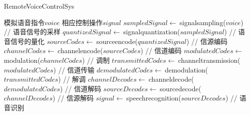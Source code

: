\documentclass[11pt]{article}
\begin{document}
\begin{CJK*}{UTF8}{gkai}
    \begin{algorithm}
        \caption{RemoteVoiceControlSys}
        \begin{algorithmic}[1] %
            \Require 模拟语音指令$voice$
            \Ensure 相应控制操作$signal$
            \State $sampledSignal \gets \ $signalsampling($voice$) // 语音信号的采样
            \State $quantizedSignal \gets\ $signalquantization($sampledSignal$) // 语音信号的量化
            \State $sourceCodes \gets \ $sourceencode($quantizedSignal$) // 信源编码
            \State $channelCodes \gets \ $channelencode($sourceCodes$) // 信道编码
            \State $modulatedCodes \gets \ $modulation($channelCodes$) // 调制
            \State $transmittedCodes \gets \ $channeltransmission($modulatedCodes$) // 信道传输
            \State $demodulatedCodes \gets \ $demodulation($transmittedCodes$) // 解调
            \State $channelDecodes \gets \ $channeldecode($demodulatedCodes$) // 信道解码
            \State $sourceDecodes \gets \ $sourcedecode($channelDecodes$) // 信源解码
            \State $signal \gets \ $speechrecognition($sourceDecodes$) // 语音识别
        \end{algorithmic}
    \end{algorithm}
\end{CJK*}
\end{document}
